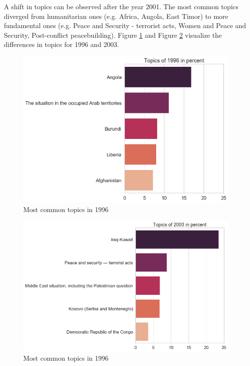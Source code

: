 A shift in topics can be observed after the year 2001. The most common topics diverged from humanitarian ones (e.g. Africa, Angola, East Timor) to more fundamental ones (e.g. Peace and Security - terrorist acts, Women and Peace and Security, Post-conflict peacebuilding). Figure \ref{common_2} and Figure \ref{common_3} visualize the differences in topics for 1996 and 2003. 
\begin{figure}[h]
  \centering
  \includegraphics[width=13cm]{img/1996_most_common_topics.png}
  \caption{Most common topics in 1996}
  \label{common_2}
\end{figure}%

\begin{figure}[h!]
  \centering
  \includegraphics[width=13cm]{img/2003_most_common_topics.png}
  \caption{Most common topics in 1996}
  \label{common_3}
\end{figure}%

